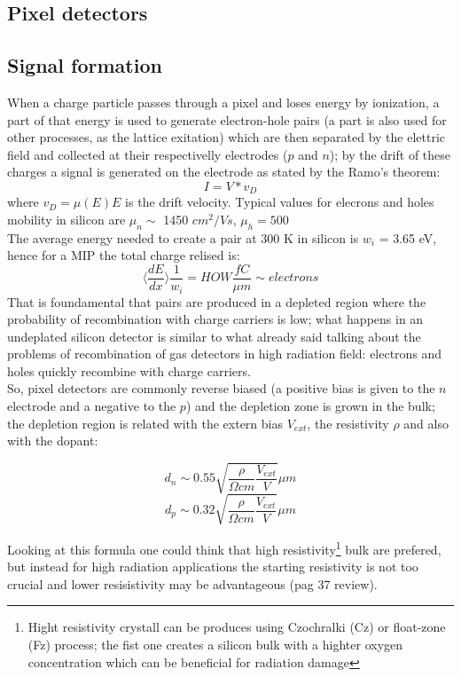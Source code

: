 \label{chip}
\begin{titlepage}

\section{Pixel detectors}
\subsection{Signal formation}
When a charge particle passes through a pixel and loses energy by ionization, a part of that
energy is used to generate electron-hole pairs (a part is also used for other processes, as the lattice 
exitation) which are then separated by the elettric field 
and collected at their respectivelly electrodes ($p$ and $n$); by the drift of these charges a 
signal is generated on the electrode as stated by the Ramo's theorem: 
\begin{equation}
   I = V * v_{D}
\end{equation}
where $v_{D} = \mu(E)E$ is the drift velocity. Typical values for elecrons and holes mobility 
in silicon are $\mu _n \sim$ 1450 $cm^2/Vs$, $\mu _h = 500$\\

The average energy needed to create a pair at 300 K in silicon is $w_i$ = 3.65 eV, hence for a MIP the total charge 
relised is: 
\begin{equation}
   \langle \frac{dE}{dx}\rangle \frac{1}{w_i} = HOW \frac{fC}{\mu m} \sim electrons
\end{equation}
That is foundamental that pairs are produced in a depleted region where the probability
of recombination with charge carriers is low; what happens in an undeplated silicon detector
is similar to what already said talking about the problems of recombination of gas detectors 
in high radiation field: electrons and holes quickly recombine with charge carriers.\\
So, pixel detectors are commonly reverse biased (a positive bias is given 
to the $n$ electrode and a negative to the $p$) and the depletion zone is grown in the bulk; 
the depletion region is related with the extern bias $V_{ext}$, the resistivity $\rho$ and also
with the dopant:
\begin{multicols}{2}
\begin{equation}
   d_{n} \sim 0.55 \sqrt{\frac{\rho}{\Omega cm}\frac{V_{ext}}{V}} \mu m 
\end{equation}\break
\begin{equation}
   d_{p} \sim 0.32 \sqrt{\frac{\rho}{\Omega cm}\frac{V_{ext}}{V}} \mu m
\end{equation}
\label{eq:deplation_d}
\end{multicols}
Looking at this formula one could think that high resistivity\footnote{Hight resistivity
crystall can be produces using Czochralki (Cz) or float-zone (Fz) process;
the fist one creates a silicon bulk with a highter oxygen concentration
which can be beneficial for radiation damage} bulk are prefered, but
instead for high radiation applications the starting resistivity is not too crucial
and lower resisistivity may be advantageous (pag 37 review).\\


\end{titlepage}
